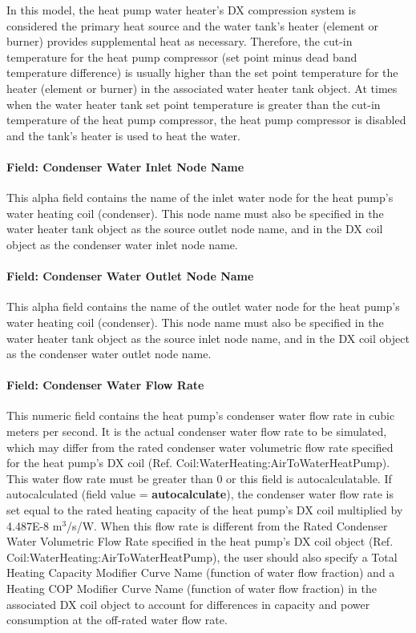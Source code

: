 In this model, the heat pump water heater's DX compression system is considered the primary heat source and the water tank's heater (element or burner) provides supplemental heat as necessary. Therefore, the cut-in temperature for the heat pump compressor (set point minus dead band temperature difference) is usually higher than the set point temperature for the heater (element or burner) in the associated water heater tank object. At times when the water heater tank set point temperature is greater than the cut-in temperature of the heat pump compressor, the heat pump compressor is disabled and the tank's heater is used to heat the water.

\paragraph{Field: Condenser Water Inlet Node Name}\label{field-condenser-water-inlet-node-name-000}

This alpha field contains the name of the inlet water node for the heat pump's water heating coil (condenser). This node name must also be specified in the water heater tank object as the source outlet node name, and in the DX coil object as the condenser water inlet node name.

\paragraph{Field: Condenser Water Outlet Node Name}\label{field-condenser-water-outlet-node-name-000}

This alpha field contains the name of the outlet water node for the heat pump's water heating coil (condenser). This node name must also be specified in the water heater tank object as the source inlet node name, and in the DX coil object as the condenser water outlet node name.

\paragraph{Field: Condenser Water Flow Rate}\label{field-condenser-water-flow-rate}

This numeric field contains the heat pump's condenser water flow rate in cubic meters per second. It is the actual condenser water flow rate to be simulated, which may differ from the rated condenser water volumetric flow rate specified for the heat pump's DX coil (Ref. Coil:WaterHeating:AirToWaterHeatPump). This water flow rate must be greater than 0 or this field is autocalculatable. If autocalculated (field value = \textbf{autocalculate}), the condenser water flow rate is set equal to the rated heating capacity of the heat pump's DX coil multiplied by 4.487E-8 m\(^{3}\)/s/W. When this flow rate is different from the Rated Condenser Water Volumetric Flow Rate specified in the heat pump's DX coil object (Ref. Coil:WaterHeating:AirToWaterHeatPump), the user should also specify a Total Heating Capacity Modifier Curve Name (function of water flow fraction) and a Heating COP Modifier Curve Name (function of water flow fraction) in the associated DX coil object to account for differences in capacity and power consumption at the off-rated water flow rate.

